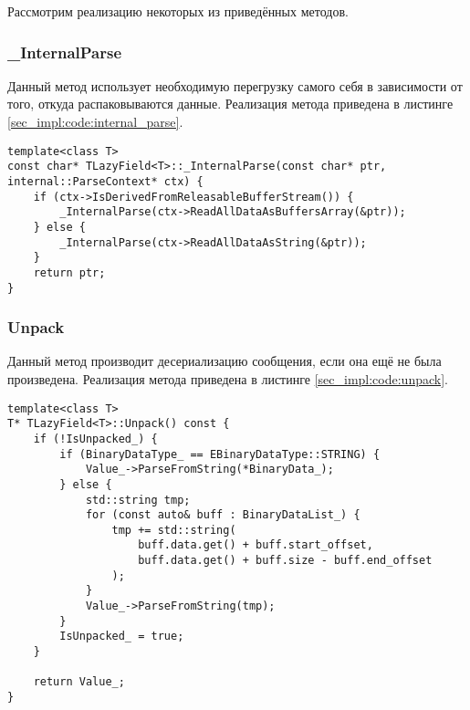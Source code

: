 Рассмотрим реализацию некоторых из приведённых методов. 

\subsubsection{\_InternalParse}

Данный метод использует необходимую перегрузку самого себя в зависимости от того, откуда распаковываются данные.
Реализация метода приведена в листинге \ref{sec_impl:code:internal_parse}.

\noindent\begin{minipage}{\linewidth}
\begin{lstlisting}[style=CodeListing, label=sec_impl:code:internal_parse, caption={Реализация метода \_InternalParse}]
template<class T>
const char* TLazyField<T>::_InternalParse(const char* ptr, internal::ParseContext* ctx) {
    if (ctx->IsDerivedFromReleasableBufferStream()) {
        _InternalParse(ctx->ReadAllDataAsBuffersArray(&ptr));
    } else {
        _InternalParse(ctx->ReadAllDataAsString(&ptr));
    }
    return ptr;
}
\end{lstlisting}
\end{minipage}

\subsubsection{Unpack}

Данный метод производит десериализацию сообщения, если она ещё не была произведена.
Реализация метода приведена в листинге \ref{sec_impl:code:unpack}.

\noindent\begin{minipage}{\linewidth}
\begin{lstlisting}[style=CodeListing, label=sec_impl:code:unpack, caption={Реализация метода Unpack}]
template<class T>
T* TLazyField<T>::Unpack() const {
    if (!IsUnpacked_) {
        if (BinaryDataType_ == EBinaryDataType::STRING) {
            Value_->ParseFromString(*BinaryData_);
        } else {
            std::string tmp;
            for (const auto& buff : BinaryDataList_) {
                tmp += std::string(
                    buff.data.get() + buff.start_offset,
                    buff.data.get() + buff.size - buff.end_offset
                );
            }
            Value_->ParseFromString(tmp);
        }
        IsUnpacked_ = true;
    }

    return Value_;
}
\end{lstlisting}
\end{minipage}

